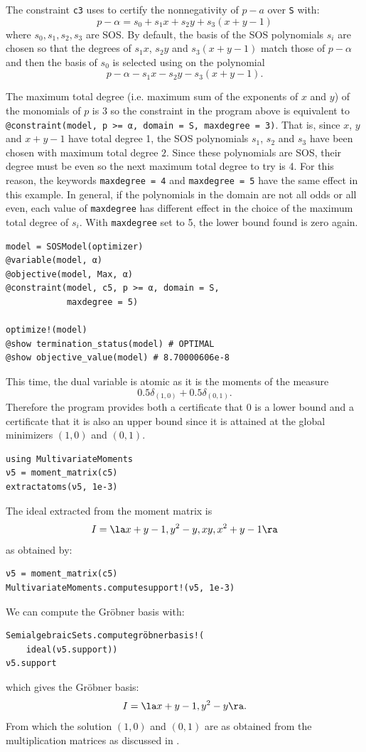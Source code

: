 \documentclass[11pt,twoside,a4paper,openright]{uclouvain-thesis}
\begin{document}
\begin{myexem}
The constraint \texttt{c3} uses  to certify the
nonnegativity of $p - a$ over \texttt{S} with:
$$ p - \alpha = s_0 + s_1 x + s_2 y + s_3 (x + y - 1) $$
where $s_0, s_1, s_2, s_3$ are SOS.
By default, the basis of the SOS polynomials $s_i$ are chosen so that the degrees of $s_1 x$, $s_2 y$ and $s_3 (x + y - 1)$ match those of $p - \alpha$ and then
the basis of $s_0$ is selected using  on the polynomial
$$ p - \alpha - s_1 x - s_2 y - s_3 (x + y - 1). $$

The maximum total degree (i.e. maximum sum of the exponents of $x$ and $y$) of the monomials of $p$ is 3 so the constraint in the program above is equivalent to \texttt{@constraint(model, p >= α, domain = S, maxdegree = 3)}.
That is, since $x$, $y$ and $x + y - 1$ have total degree 1, the SOS polynomials $s_1$, $s_2$ and $s_3$ have been chosen with maximum total degree $2$.
Since these polynomials are SOS, their degree must be even so the next maximum total degree to try is 4.
For this reason, the keywords \texttt{maxdegree = 4} and \texttt{maxdegree = 5} have the same effect in this example.
In general, if the polynomials in the domain are not all odds or all even, each value of \texttt{maxdegree} has different effect in the choice of the maximum total degree of $s_i$.
With \texttt{maxdegree} set to 5, the lower bound found is zero again.
\begin{verbatim}
model = SOSModel(optimizer)
@variable(model, α)
@objective(model, Max, α)
@constraint(model, c5, p >= α, domain = S,
            maxdegree = 5)

optimize!(model)
@show termination_status(model) # OPTIMAL
@show objective_value(model) # 8.70000606e-8
\end{verbatim}
This time, the dual variable is atomic as it is the moments of the measure
$$0.5 \delta_{(1, 0)} + 0.5 \delta_{(0, 1)}.$$
Therefore the program provides both a certificate that $0$ is a lower bound and a certificate that it is also an upper bound since it is attained at the global minimizers $(1, 0)$ and $(0, 1)$.
\begin{verbatim}
using MultivariateMoments
ν5 = moment_matrix(c5)
extractatoms(ν5, 1e-3)
\end{verbatim}
The ideal extracted from the moment matrix is
\[
  I = \la x + y - 1, y^2 - y, xy, x^2 + y - 1 \ra
\]
as obtained by:
\begin{verbatim}
ν5 = moment_matrix(c5)
MultivariateMoments.computesupport!(ν5, 1e-3)
\end{verbatim}
We can compute the Gr\"{o}bner basis with:
\begin{verbatim}
SemialgebraicSets.computegröbnerbasis!(
    ideal(ν5.support))
ν5.support
\end{verbatim}
which gives the Gr\"{o}bner basis:
\[
  I = \la x + y - 1, y^2 - y \ra.
\]
From which the solution $(1, 0)$ and $(0, 1)$ are as obtained
from the multiplication matrices as discussed in .

\end{myexem}
\end{document}
